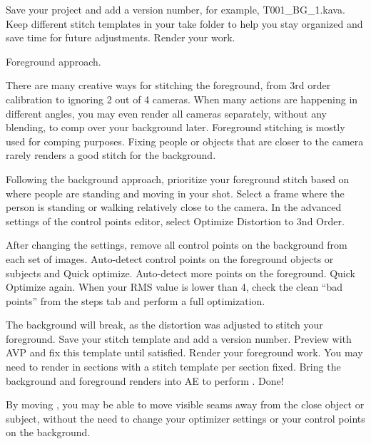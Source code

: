 \begin{fullwidth}
Save your project and add a version number, for example, T001\_BG\_1.kava. Keep different stitch templates in your take folder to help you stay organized and save time for future adjustments. Render your work.


{\large Foreground approach. \par}

There are many creative ways for stitching the foreground, from 3rd order calibration to ignoring 2 out of 4 cameras. When many actions are happening in different angles, you may even render all cameras separately, without any blending, to comp over your background later. Foreground stitching is mostly used for comping purposes. Fixing people or objects that are closer to the camera rarely renders a good stitch for the background.

\clearpage

Following the background approach, prioritize your foreground stitch based on where people are standing and moving in your shot. Select a frame where the person is standing or walking relatively close to the camera. In the advanced settings of the control points editor, select Optimize Distortion to 3nd Order.


After changing the settings, remove all control points on the background from each set of images. Auto-detect control points on the foreground objects or subjects and Quick optimize. Auto-detect more points on the foreground. Quick Optimize again. When your RMS value is lower than 4, check the clean “bad points” from the steps tab and perform a full optimization.


\clearpage

The background will break, as the distortion was adjusted to stitch your foreground. Save your stitch template and add a version number. Preview with AVP and fix this template until satisfied. Render your foreground work. You may need to render in sections with a stitch template per section fixed. Bring the background and foreground renders into AE to perform \textbf{}. Done!


\tip By moving \textbf{}, you may be able to move visible seams away from the close object or subject, without the need to change your optimizer settings or your control points on the background.


\clearpage
\end{fullwidth}